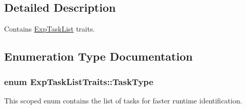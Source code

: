 \subsection{Detailed Description}
Contains \hyperlink{class_exp_task_list}{Exp\+Task\+List} traits. 

\subsection{Enumeration Type Documentation}
\hypertarget{namespace_exp_task_list_traits_adcf9a5159b43c6df6f5e6835170c25b2}{}
\subsubsection[{Task\+Type}]{\setlength{\rightskip}{0pt plus 5cm}enum {\bf Exp\+Task\+List\+Traits\+::\+Task\+Type}\hspace{0.3cm}{\ttfamily [strong]}}\label{namespace_exp_task_list_traits_adcf9a5159b43c6df6f5e6835170c25b2}


This scoped enum contains the list of tasks for faster runtime identification. 

